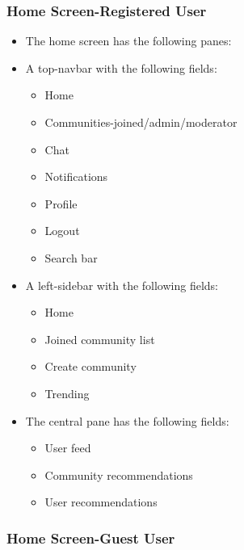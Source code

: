 \documentclass[conference,compsoc]{IEEEtran}
\begin{document}
\subsubsection{Home Screen-Registered User}
\vspace{0.2cm}

\begin{itemize}
    \item The home screen has the following panes:

    \item A top-navbar with the following fields:
          \begin{itemize}
              \item Home
              \item Communities-joined/admin/moderator
              \item Chat
              \item Notifications
              \item Profile
              \item Logout
              \item Search bar
          \end{itemize}
    \item A left-sidebar with the following fields:
          \begin{itemize}
              \item Home
              \item Joined community list
              \item Create community
              \item Trending
          \end{itemize}
    \item The central pane has the following fields:
          \begin{itemize}
              \item User feed
              \item Community recommendations
              \item User recommendations
          \end{itemize}
\end{itemize}

\subsubsection{Home Screen-Guest User}
\vspace{0.2cm}
\end{document}
